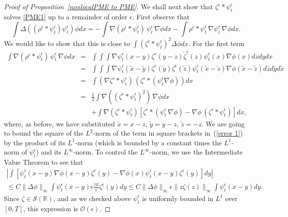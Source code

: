 \documentclass[EJP]{ejpecp} %
\renewcommand{\tilde}{\widetilde}
\newcommand{\IR}{\mathbb R}
\begin{document}
\begin{proof}[Proof of Proposition~\ref{nonlocalPME to PME}]
We shall next show that $\zeta^\epsilon * \psi_t^\epsilon$ solves \eqref{PME1}
up to a remainder of order $\epsilon$.
First observe that
\begin{equation}
\label{total equation}
\int\Delta\left((\rho^{\epsilon}*\psi_t^\epsilon)\psi_t^\epsilon\right)\phi  dx
    =
    - \int \nabla(\rho^{\epsilon}*\psi_t^\epsilon)\, \psi_t^\epsilon\,\nabla\phi dx
    -\int \rho^{\epsilon}*\psi_t^\epsilon \,\nabla \psi_t^\epsilon \, \nabla\phi dx.
\end{equation}
We would like to show that this is close to $\int (\zeta^\epsilon * \psi^\epsilon_t)^2 \Delta \phi dx$.
For the first term
\begin{eqnarray}
\nonumber
\int \nabla(\rho^{\epsilon}*\psi_t^\epsilon)\, \psi_t^\epsilon\, \nabla\phi  dx
&=&
\int\int\int\nabla \psi_t^\epsilon(x-y)\zeta^{\epsilon}(y-z)
\check{\zeta}^{\epsilon}(z)
\psi_t^\epsilon(x)\nabla\phi(x) dz  dy  dx
\\
\nonumber
&=&
\int\int\int\nabla \psi_t^\epsilon(\tilde{x}-\tilde{y})
\zeta^{\epsilon}(\tilde{y})
\zeta^{\epsilon}(\tilde{z})\psi_t^\epsilon(\tilde{x}-\tilde{z})
\nabla\phi(\tilde{x}-\tilde{z}) d\tilde{z} d\tilde{y} d\tilde{x}
\\
\nonumber
&=&\int(\nabla \zeta^{\epsilon}*\psi_t^\epsilon)\,
\left(\zeta^{\epsilon}*(\psi_t^\epsilon\nabla\phi)\right)
d x\\
\nonumber
&=&
\frac{1}{2}\int\nabla ((\zeta^{\epsilon}*\psi_t^\epsilon)^2)
\,\nabla\phi  dx
\\
\label{error 1}
&&+
\int\nabla(\zeta^{\epsilon}*\psi_t^\epsilon)
\left[\zeta^{\epsilon}*(\psi_t^\epsilon\,\nabla\phi)-
\nabla\phi\,(\zeta^{\epsilon}*\psi_t^\epsilon)\right] dx,
\end{eqnarray}
where, as before, we have substituted $\tilde{x}=x-z$, $\tilde{y}=y-z$,
$\tilde{z}=-z$.
We are going to bound the square of the $L^2$-norm of the term in square brackets 
in~(\ref{error 1}) by the product of its $L^1$-norm (which is bounded
by a constant times the $L^1$-norm of $\psi_t^\epsilon$) and its $L^\infty$-norm.
To control the $L^\infty$-norm,
we use the Intermediate Value Theorem to see that
\begin{multline*}
\left|\int\left[\psi_t^\epsilon(x-y)\nabla\phi(x-y)\zeta^{\epsilon}(y)-
\nabla\phi(x)\psi_t^\epsilon(x-y)\zeta^{\epsilon}(y)
\right] dy\right|
\\
	\leq C\|\Delta\phi\|_\infty\int \psi_t^\epsilon (x-y)
	\epsilon\frac{|y|}{\epsilon}\zeta^{\epsilon}(y) d y
	\leq C\|\Delta\phi\|_\infty\epsilon \|z\zeta(z)\|_\infty\int \psi_t^\epsilon (x-y) dy.
\end{multline*}
Since $\zeta\in\mathcal{S}(\IR)$, and as we checked above $\psi_t^\epsilon$ is 
uniformly bounded in $L^1$ over $[0,T]$,
this expression is
$\mathcal{O}(\epsilon)$.  


\end{proof}
\end{document}
